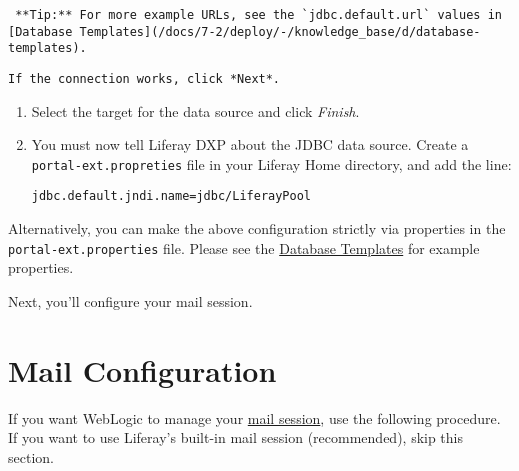 \noindent\hrulefill

\begin{verbatim}
 **Tip:** For more example URLs, see the `jdbc.default.url` values in [Database Templates](/docs/7-2/deploy/-/knowledge_base/d/database-templates).
\end{verbatim}

\noindent\hrulefill

\begin{verbatim}
If the connection works, click *Next*.
\end{verbatim}

\begin{enumerate}
\def\labelenumi{\arabic{enumi}.}
\setcounter{enumi}{6}
\item
  Select the target for the data source and click \emph{Finish}.
\item
  You must now tell Liferay DXP about the JDBC data source. Create a
  \texttt{portal-ext.propreties} file in your Liferay Home directory,
  and add the line:

\begin{verbatim}
jdbc.default.jndi.name=jdbc/LiferayPool
\end{verbatim}
\end{enumerate}

Alternatively, you can make the above configuration strictly via
properties in the \texttt{portal-ext.properties} file. Please see the
\href{/docs/7-2/deploy/-/knowledge_base/d/database-templates}{Database
Templates} for example properties.

Next, you'll configure your mail session.

\section{Mail Configuration}\label{mail-configuration-3}

If you want WebLogic to manage your
\href{/docs/7-2/deploy/-/knowledge_base/d/configuring-mail}{mail
session}, use the following procedure. If you want to use Liferay's
built-in mail session (recommended), skip this section.

